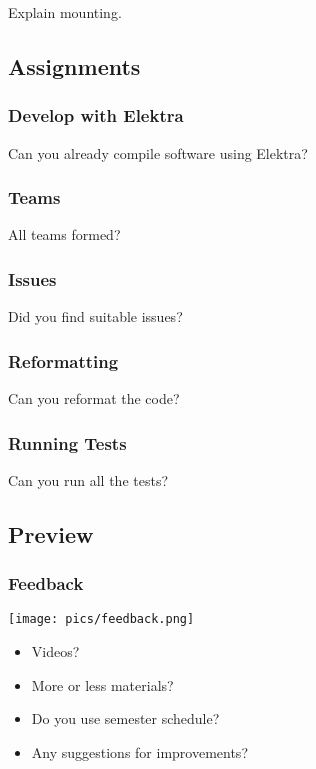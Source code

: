 \begin{frame}
	\begin{task}
	Explain mounting.
	\end{task}
\end{frame}

\subsection{Assignments}

\begin{frame}
	\frametitle{Develop with Elektra}

	\begin{task}
	Can you already compile software using Elektra?
	\end{task}
\end{frame}

\begin{frame}
	\frametitle{Teams}

	\begin{task}
	All teams formed?
	\end{task}
\end{frame}

\begin{frame}
	\frametitle{Issues}

	\begin{task}
	Did you find suitable issues?
	\end{task}
\end{frame}

\begin{frame}
	\frametitle{Reformatting}

	\begin{task}
	Can you reformat the code?
	\end{task}
\end{frame}

\begin{frame}
	\frametitle{Running Tests}

	\begin{task}
	Can you run all the tests?
	\end{task}
\end{frame}


\subsection{Preview}

\begin{frame}
	\frametitle{Feedback}
	\hfill \texttt{[image: pics/feedback.png]}
	\vspace{-1cm}
	\begin{itemize}
		\item Videos?
		\item More or less materials?
		\item Do you use semester schedule?
		\item Any suggestions for improvements?
	\end{itemize}
\end{frame}

